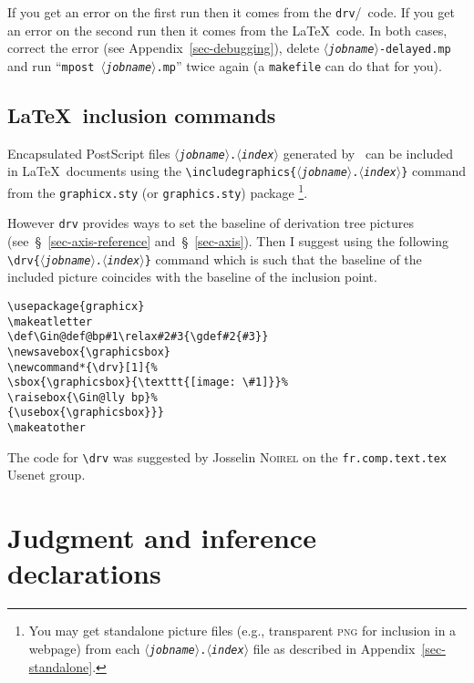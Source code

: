 \documentclass[twoside,11pt]{article}
\makeatletter
\def\Gin@def@bp#1\relax#2#3{\gdef#2{#3}}
\newcommand*{\drv}[1]{%
\sbox{\graphicsbox}{\texttt{[image: \#1]}}%
\raisebox{\Gin@lly bp}%
{\usebox{\graphicsbox}}}
\newcommand{\param}[1]{\textrm{\textit{$\langle$#1\/$\rangle$}}}
\newcommand{\tbs}{\textbackslash}
\makeatother
\begin{document}
If you get an error on the first run then it comes from the
\texttt{drv}/\MP\ code. If you get an error on the second run then it comes
from the \LaTeX\ code. In both cases, correct the error (see
Appendix~\ref{sec-debugging}), delete \texttt{\param{jobname}-delayed.mp} and
run ``\texttt{mpost \param{jobname}.mp}'' twice again (a \texttt{makefile} can
do that for you).
%
%
\subsection{\LaTeX\ inclusion commands\label{sec-inclusion}}
%
%
Encapsulated PostScript files \texttt{\param{jobname}.\param{index}} generated
by \MP\ can be included in \LaTeX\ documents using the
\texttt{\tbs{}includegraphics\{\param{jobname}.\param{index}\}}
command from the \texttt{graphicx.sty} (or \texttt{graphics.sty}) package%
\footnote{You may get standalone picture files (e.g., transparent \textsc{png}
for inclusion in a webpage) from each \texttt{\param{jobname}.\param{index}}
file as described in Appendix~\ref{sec-standalone}.}.

However \texttt{drv} provides ways to set the baseline of
derivation tree pictures  (see~\S~\ref{sec-axis-reference}
 and~\S~\ref{sec-axis}). Then I suggest using the following
\texttt{\tbs{}drv\{\param{jobname}.\param{index}\}} command which is
such that the baseline of the included picture coincides with the baseline of
the inclusion point.
\begin{Verbatim}
\usepackage{graphicx}
\makeatletter
\def\Gin@def@bp#1\relax#2#3{\gdef#2{#3}}
\newsavebox{\graphicsbox}
\newcommand*{\drv}[1]{%
\sbox{\graphicsbox}{\texttt{[image: \#1]}}%
\raisebox{\Gin@lly bp}%
{\usebox{\graphicsbox}}}
\makeatother
\end{Verbatim}
The code for \texttt{\tbs{}drv} was suggested by Josselin
\textsc{Noirel} on the \texttt{fr.comp.text.tex} Usenet group.
%
%
\section{Judgment and inference declarations\label{sec-declarations}}
%
%
\end{document}

